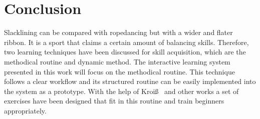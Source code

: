 \section{Conclusion}
Slacklining can be compared with ropedancing but with a wider and flater ribbon. It is a sport that claims a certain amount of balancing skills. Therefore, two learning techniques have been discussed for skill acquisition, which are the methodical routine and dynamic method. The interactive learning system presented in this work will focus on the methodical routine. This technique follows a clear workflow and its structured routine can be easily implemented into the system as a prototype. With the help of Kroiß~\cite{Kroiss2007-ab} and other works a set of exercises have been designed that fit in this routine and train beginners appropriately.

